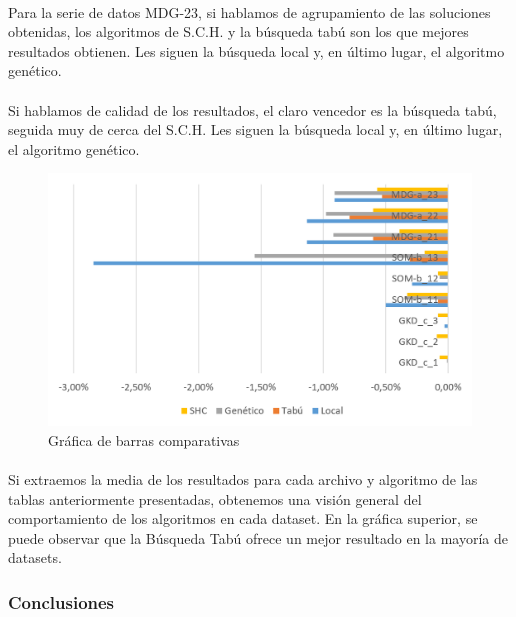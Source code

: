 	\paragraph{}Para la serie de datos MDG-23, si hablamos de agrupamiento de las soluciones obtenidas, los algoritmos de S.C.H. y la búsqueda tabú son los que mejores resultados obtienen. Les siguen la búsqueda local y, en último lugar, el algoritmo genético.
	
	\paragraph{}Si hablamos de calidad de los resultados, el claro vencedor es la búsqueda tabú, seguida muy de cerca del S.C.H. Les siguen la búsqueda local y, en último lugar, el algoritmo genético.
	
	\begin{figure}[H]
		\centering
		\includegraphics[scale=0.3]{img/MediaFinal.png}
		\caption{Gráfica de barras comparativas}
		\label{Medias_final}
	\end{figure}

	\paragraph{}Si extraemos la media de los resultados para cada archivo y algoritmo de las tablas anteriormente presentadas, obtenemos una visión general del comportamiento de los algoritmos en cada dataset. En la gráfica superior, se puede observar que la Búsqueda Tabú ofrece un mejor resultado en la mayoría de datasets.
	
	\subsubsection{Conclusiones}
	

